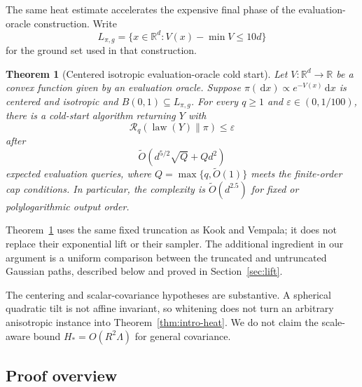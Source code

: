 \documentclass[11pt]{article}
\newtheorem{theorem}{Theorem}[section]
\theoremstyle{remark}
\newcommand{\R}{\mathbb R}
\newcommand{\1}{\bm 1}
\newcommand{\eps}{\varepsilon}
\newcommand{\law}{\operatorname{law}}
\newcommand{\dd}{\,\mathrm d}
\begin{document}
The same heat estimate accelerates the expensive final phase of the
evaluation-oracle construction.  Write
\[
  L_{\pi,g}=\{x\in\R^d:V(x)-\min V\leq10d\}
\]
for the ground set used in that construction.

\begin{theorem}[Centered isotropic evaluation-oracle cold start]
\label{thm:intro-evaluation}
Let $V:\R^d\to\R$ be a convex function given by an evaluation oracle.
Suppose
$\pi(\dd x)\propto e^{-V(x)}\dd x$ is centered and isotropic and
$B(0,1)\subseteq L_{\pi,g}$.  For every $q\geq1$ and
$\eps\in(0,1/100)$, there is a cold-start algorithm returning $Y$ with
\[
  \mathcal R_q(\law(Y)\|\pi)\leq\eps
\]
after
\begin{equation}\label{eq:intro-evaluation-bound}
  \widetilde O\!\left(d^{5/2}\sqrt Q+Qd^2\right)
\end{equation}
expected evaluation queries, where
$Q=\max\{q,\widetilde O(1)\}$ meets the finite-order cap conditions.
In particular, the complexity is $\widetilde O(d^{2.5})$ for fixed or
polylogarithmic output order.
\end{theorem}

Theorem~\ref{thm:intro-evaluation} uses the same fixed truncation as
Kook and Vempala; it does not replace their exponential lift or their
sampler.  The additional ingredient in our argument is a uniform
comparison between the truncated and untruncated Gaussian paths,
described below and proved in Section~\ref{sec:lift}.

The centering and scalar-covariance hypotheses are substantive.  A
spherical quadratic tilt is not affine invariant, so whitening does not
turn an arbitrary anisotropic instance into Theorem~\ref{thm:intro-heat}.
We do not claim the scale-aware bound
$H_*=O(R^2\Lambda)$ for general covariance.

\subsection{Proof overview}
\end{document}
